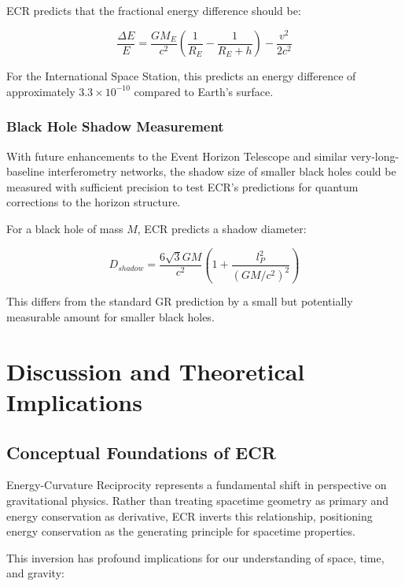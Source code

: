 \documentclass[11pt,a4paper]{article}
\begin{document}
ECR predicts that the fractional energy difference should be:

\begin{equation}
    \frac{\Delta E}{E} = \frac{GM_E}{c^2}\left(\frac{1}{R_E} - \frac{1}{R_E+h}\right) - \frac{v^2}{2c^2}
\end{equation}

For the International Space Station, this predicts an energy difference of approximately $3.3 \times 10^{-10}$ compared to Earth's surface.

\subsubsection{Black Hole Shadow Measurement}

With future enhancements to the Event Horizon Telescope and similar very-long-baseline interferometry networks, the shadow size of smaller black holes could be measured with sufficient precision to test ECR's predictions for quantum corrections to the horizon structure.

For a black hole of mass $M$, ECR predicts a shadow diameter:

\begin{equation}
    D_{shadow} = \frac{6\sqrt{3}GM}{c^2}\left(1 + \frac{l_P^2}{(GM/c^2)^2}\right)
\end{equation}

This differs from the standard GR prediction by a small but potentially measurable amount for smaller black holes.

\section{Discussion and Theoretical Implications}\label{sec:discuss}

\subsection{Conceptual Foundations of ECR}

Energy-Curvature Reciprocity represents a fundamental shift in perspective on gravitational physics. Rather than treating spacetime geometry as primary and energy conservation as derivative, ECR inverts this relationship, positioning energy conservation as the generating principle for spacetime properties.

This inversion has profound implications for our understanding of space, time, and gravity:
\end{document}
